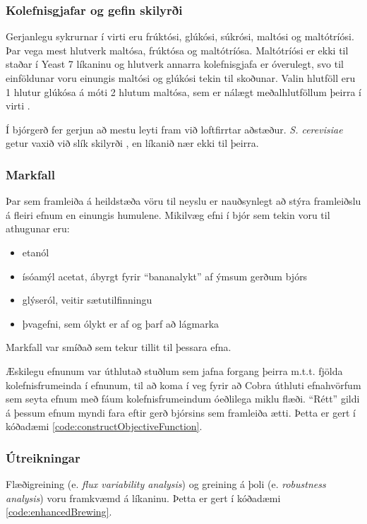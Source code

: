 \documentclass[11pt]{article}
\begin{document}
\begin{multicols}{2}
\subsubsection{Kolefnisgjafar og gefin skilyrði}
Gerjanlegu sykrurnar í virti eru frúktósi, glúkósi, súkrósi, maltósi og maltótríósi. Þar vega mest hlutverk maltósa, frúktósa og maltótríósa. Maltótríósi er ekki til staðar í Yeast 7 líkaninu og hlutverk annarra kolefnisgjafa er óverulegt, svo til einföldunar voru einungis maltósi og glúkósi tekin til skoðunar. Valin hlutföll eru 1 hlutur glúkósa á móti 2 hlutum maltósa, sem er nálægt meðalhlutföllum þeirra í virti \cite{otter1967determination}. 

Í bjórgerð fer gerjun að mestu leyti fram við loftfirrtar aðstæður. \emph{S. cerevisiae} getur vaxið við slík skilyrði \cite{ishtar2007factors}, en líkanið nær ekki til þeirra.
\subsubsection{Markfall}
Þar sem framleiða á heildstæða vöru til neyslu er nauðsynlegt að stýra framleiðslu á fleiri efnum en einungis humulene. Mikilvæg efni í bjór \cite{dequin2001potential} sem tekin voru til athugunar eru:
\begin{itemize}
 \item etanól
 \item ísóamýl acetat, ábyrgt fyrir ``bananalykt'' af ýmsum gerðum bjórs
 \item glýseról, veitir sætutilfinningu
 \item þvagefni, sem ólykt er af og þarf að lágmarka
\end{itemize}
Markfall var smíðað sem tekur tillit til þessara efna. 

Æskilegu efnunum var úthlutað stuðlum sem jafna forgang þeirra m.t.t. fjölda kolefnisfrumeinda í efnunum, til að koma í veg fyrir að Cobra úthluti efnahvörfum sem seyta efnum með fáum kolefnisfrumeindum óeðlilega miklu flæði. ``Rétt'' gildi á þessum efnum myndi fara eftir gerð bjórsins sem framleiða ætti. Þetta er gert í kóðadæmi \ref{code:constructObjectiveFunction}.

\subsubsection{Útreikningar}
Flæðigreining (e. \emph{flux variability analysis}) og greining á þoli (e. \emph{robustness analysis}) voru framkvæmd á líkaninu. Þetta er gert í kóðadæmi \ref{code:enhancedBrewing}.


\end{multicols}
\end{document}
